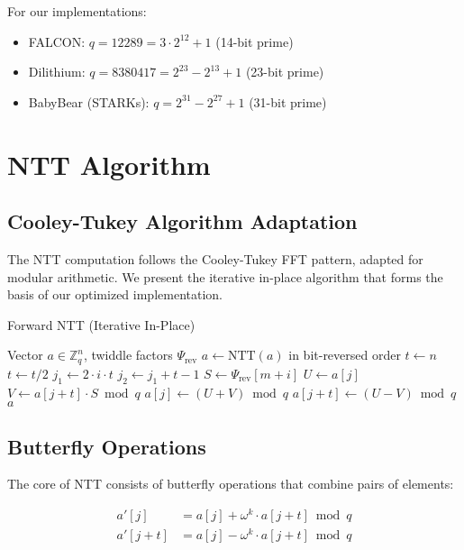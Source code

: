 \documentclass[11pt,a4paper]{article}
\begin{document}
For our implementations:
\begin{itemize}
\item FALCON: $q = 12289 = 3 \cdot 2^{12} + 1$ (14-bit prime)
\item Dilithium: $q = 8380417 = 2^{23} - 2^{13} + 1$ (23-bit prime)
\item BabyBear (STARKs): $q = 2^{31} - 2^{27} + 1$ (31-bit prime)
\end{itemize}

\section{NTT Algorithm}

\subsection{Cooley-Tukey Algorithm Adaptation}

The NTT computation follows the Cooley-Tukey FFT pattern, adapted for modular arithmetic. We present the iterative in-place algorithm that forms the basis of our optimized implementation.

\begin{algorithm}
\caption{Forward NTT (Iterative In-Place)}
\begin{algorithmic}[1]
\REQUIRE Vector $a \in \mathbb{Z}_q^n$, twiddle factors $\Psi_{\text{rev}}$
\ENSURE $a \leftarrow \text{NTT}(a)$ in bit-reversed order
\STATE $t \leftarrow n$
    \STATE $t \leftarrow t / 2$
        \STATE $j_1 \leftarrow 2 \cdot i \cdot t$
        \STATE $j_2 \leftarrow j_1 + t - 1$
        \STATE $S \leftarrow \Psi_{\text{rev}}[m + i]$
            \STATE $U \leftarrow a[j]$
            \STATE $V \leftarrow a[j + t] \cdot S \bmod q$
            \STATE $a[j] \leftarrow (U + V) \bmod q$
            \STATE $a[j + t] \leftarrow (U - V) \bmod q$
        \ENDFOR
    \ENDFOR
\ENDFOR
\RETURN $a$
\end{algorithmic}
\end{algorithm}

\subsection{Butterfly Operations}

The core of NTT consists of butterfly operations that combine pairs of elements:

\begin{align}
a'[j] &= a[j] + \omega^k \cdot a[j + t] \bmod q \\
a'[j + t] &= a[j] - \omega^k \cdot a[j + t] \bmod q
\end{align}
\end{document}
